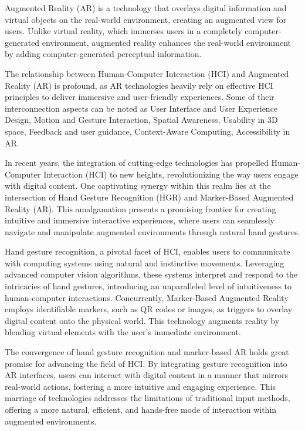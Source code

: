\documentclass[journal]{IEEEtran}
\begin{document}
Augmented Reality (AR) is a technology that overlays digital information and virtual objects on the real-world environment, 
creating an augmented view for users. Unlike virtual reality, which immerses users in a completely computer-generated environment, 
augmented reality enhances the real-world environment by adding computer-generated perceptual information.

The relationship between Human-Computer Interaction (HCI) and Augmented Reality (AR) is profound, as AR technologies heavily 
rely on effective HCI principles to deliver immersive and user-friendly experiences. Some of their interconnection aspects can 
be noted as User Interface and User Experience Design, Motion and Gesture Interaction, Spatial Awareness, Usability in 3D space, 
Feedback and user guidance, Context-Aware Computing, Accessibility in AR.

In recent years, the integration of cutting-edge technologies has propelled Human-Computer Interaction (HCI) to new heights, 
revolutionizing the way users engage with digital content. One captivating synergy within this realm lies at the intersection 
of Hand Gesture Recognition (HGR) and Marker-Based Augmented Reality (AR). This amalgamation presents a promising frontier for 
creating intuitive and immersive interactive experiences, where users can seamlessly navigate and manipulate augmented environments 
through natural hand gestures.

Hand gesture recognition, a pivotal facet of HCI, enables users to communicate with computing systems using natural and instinctive 
movements. Leveraging advanced computer vision algorithms, these systems interpret and respond to the intricacies of hand gestures, 
introducing an unparalleled level of intuitiveness to human-computer interactions. Concurrently, Marker-Based Augmented Reality 
employs identifiable markers, such as QR codes or images, as triggers to overlay digital content onto the physical world. 
This technology augments reality by blending virtual elements with the user's immediate environment.

The convergence of hand gesture recognition and marker-based AR holds great promise for advancing the field of HCI. By integrating 
gesture recognition into AR interfaces, users can interact with digital content in a manner that mirrors real-world actions, 
fostering a more intuitive and engaging experience. This marriage of technologies addresses the limitations of traditional input methods, 
offering a more natural, efficient, and hands-free mode of interaction within augmented environments.
\end{document}
